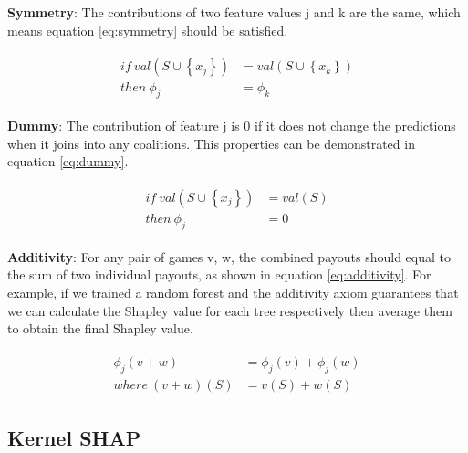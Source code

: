 \textbf{Symmetry}: The contributions of two feature values j and k are the same, which means equation \ref{eq:symmetry} should be satisfied. 

\begin{equation} \label{eq:symmetry}
\begin{gathered}
\begin{aligned}
if \ val\left(S \cup\left\{x_{j}\right\}\right) &= val\left(S \cup\left\{x_{k}\right\}\right) \\
then \  \phi_{j} &= \phi_{k}
\end{aligned}
\end{gathered}
\end{equation}

\textbf{Dummy}: The contribution of feature j is 0 if it does not change the predictions when it joins into any coalitions. This properties can be demonstrated in equation \ref{eq:dummy}.

\begin{equation} \label{eq:dummy}
\begin{gathered}
\begin{aligned}
if \ val\left(S \cup\left\{x_{j}\right\}\right) &= val\left(S \right) \\
then \  \phi_{j} &= 0
\end{aligned}
\end{gathered}
\end{equation}

\textbf{Additivity}: For any pair of games v, w, the combined payouts should equal to the sum of two individual payouts, as shown in equation \ref{eq:additivity}. For example, if we trained a random forest and the additivity axiom guarantees that we can calculate the Shapley value for each tree respectively then average them to obtain the final Shapley value. 

\begin{equation} \label{eq:additivity}
\begin{gathered}
\begin{aligned}
\phi_{j}(v+w) &= \phi_{j}(v) + \phi_{j}(w) \\
where \ (v+w)(S) &= v(S) + w(S)
\end{aligned}
\end{gathered}
\end{equation}

\subsection{Kernel SHAP}

